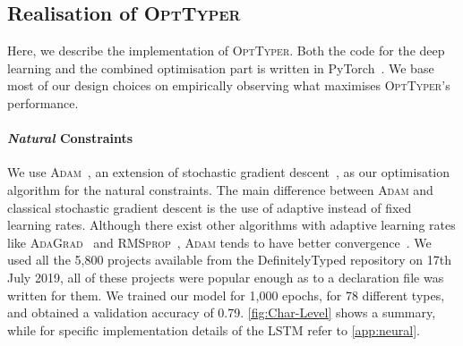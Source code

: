 \documentclass[acmsmall, review, anonymous]{acmart}\settopmatter{printfolios=true,printccs=false,printacmref=false}
\newcommand{\projectname}{\textsc{OptTyper}\xspace}
\begin{document}
\subsection{Realisation of \projectname{}}\label{ssec:combprodts}

Here, we describe the implementation of \projectname. Both the code for the deep
learning and the combined optimisation part is written in
PyTorch~\cite{paszke2017}. We base most of our design choices on empirically
observing what maximises \projectname's performance.

\paragraph{\textit{Natural} Constraints} We use \textsc{Adam}~\cite{kingma2014}, an extension of stochastic gradient descent~\cite{robbins51},
as our optimisation algorithm for the natural constraints.
%
The main difference between \textsc{Adam} and classical stochastic gradient descent
is the use of adaptive instead of fixed learning rates.
%
Although there exist other algorithms with adaptive learning rates
like \textsc{AdaGrad}~\cite{duchi2011} and \textsc{RMSprop}~\cite{tieleman2014},
\textsc{Adam} tends to have better convergence~\cite{ruder2016}.
We used all the 5,800 projects available from the DefinitelyTyped repository on 17th July 2019, all of these projects were popular enough as to a declaration file was written for them.
%
We trained our model for 1,000 epochs, for 78 different types,
and obtained a validation accuracy of 0.79.
\cref{fig:Char-Level} shows a summary, while for specific implementation details of the LSTM refer to \cref{app:neural}.
\end{document}
